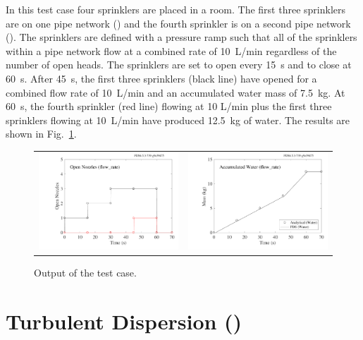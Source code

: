 \documentclass[11pt]{book}
\begin{document}
In this test case four sprinklers are placed in a room.  The first three sprinklers are on one pipe network () and the fourth sprinkler is on a second pipe network ().  The sprinklers are defined with a pressure ramp such that all of the sprinklers within a pipe network flow at a combined rate of 10~L/min regardless of the number of open heads.  The sprinklers are set to open every 15~s and to close at 60~s.  After 45~s, the first three sprinklers (black line) have opened for a combined flow rate of 10~L/min and an accumulated water mass of 7.5~kg.  At 60~s, the fourth sprinkler (red line) flowing at 10 L/min plus the first three sprinklers flowing at 10~L/min have produced 12.5~kg of water. The results are shown in Fig.~\ref{flow_rate_2_figure}.

\begin{figure}[ht]
\begin{tabular*}{\textwidth}{lr}
\includegraphics[width=3.2in]{SCRIPT_FIGURES/flow_rate_2_open_nozzles} &
\includegraphics[width=3.2in]{SCRIPT_FIGURES/flow_rate_2_water_mass}
\end{tabular*}
\caption[The  case]{Output of the  test case.}
\label{flow_rate_2_figure}
\end{figure}


\clearpage

\section{Turbulent Dispersion (\texorpdfstring{{}}{random\_walk}) }
\label{turbulent_dispersion}
\end{document}
